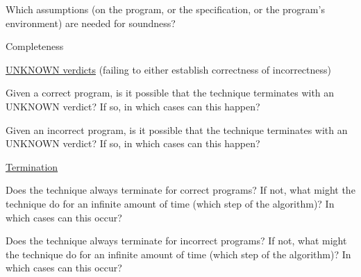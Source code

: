 \documentclass[a4paper]{article}
\begin{document}
\begin{minipage}[t]{0.16\linewidth}
\begin{betterlist}
\begin{betterlist}
\begin{betterlist}
			\end{betterlist}
			\item Which assumptions (on the program, or the specification, or the program’s environment) are needed for soundness?
		\end{betterlist}
		\item \alert{Completeness}
		\begin{betterlist}
			\item \underline{UNKNOWN verdicts} (failing to either establish correctness of incorrectness)
			\begin{betterlist}
				\item Given a correct program, is it possible that the technique terminates with an UNKNOWN verdict? If so, in which cases can this happen?

				\item Given an incorrect program, is it possible that the technique terminates with an UNKNOWN verdict? If so, in which cases can this happen?

			\end{betterlist}
			\item \underline{Termination}
			\begin{betterlist}
				\item Does the technique always terminate for correct programs? If not, what might the technique do for an infinite amount of time (which step of the algorithm)? In which cases can this occur?

				\framebox[0.95\textwidth][l]{\parbox{0.90\textwidth}{
						\begin{betterlist}
							\item TODO
						\end{betterlist}
					}}
				\item Does the technique always terminate for incorrect programs? If not, what might the technique do for an infinite amount of time (which step of the algorithm)? In which cases can this occur?


\end{betterlist}
\end{betterlist}
\end{betterlist}
\end{minipage}
\end{document}
